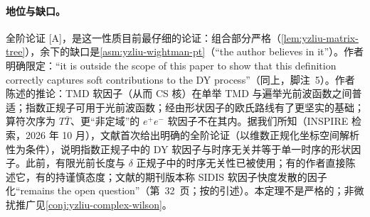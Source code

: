 \paragraph{地位与缺口。}全阶论证 [A]，是这一性质目前最仔细的论证：组合部分严格（\cref{lem:yzliu-matrix-tree}），余下的缺口是\cref{asm:yzliu-wightman-pt}（“the author believes in it”\cite[第~4~节]{Liu:2023pjb}）。作者明确限定：“it is outside the scope of this paper to show that this definition correctly captures soft contributions to the DY process”（同上，脚注~5）。作者陈述的推论：TMD 软因子（从而 CS 核）在单举 TMD 与遍举光前波函数之间普适；指数正规子可用于光前波函数；经由形状因子的欧氏路线有了更坚实的基础；算符次序为 $T\bar T$、更“非定域”的 $e^+e^-$ 软因子不在其内。据我们所知（INSPIRE 检索，2026 年 10 月），文献\cite{Liu:2023pjb}首次给出明确的全阶论证（以维数正规化坐标空间解析性为条件），说明指数正规子中的 DY 软因子与时序无关并等于单一时序的形状因子。此前，有限光前长度与 $\delta$ 正规子中的时序无关性已被使用\cite{Vladimirov:2016dll,Vladimirov:2017ksc}；有的作者直接陈述它\cite{Collins2011,CollinsMetz2004,Echevarria:2015byo}，有的持谨慎态度\cite{Moult:2018jzp}；文献\cite{Vladimirov:2017ksc}的期刊版本称 SIDIS 软因子快度发散的因子化“remains the open question”（第~32~页；按\cite{Liu:2023pjb}的引述）。本定理不是严格的；非微扰推广见\cref{conj:yzliu-complex-wilson}。

